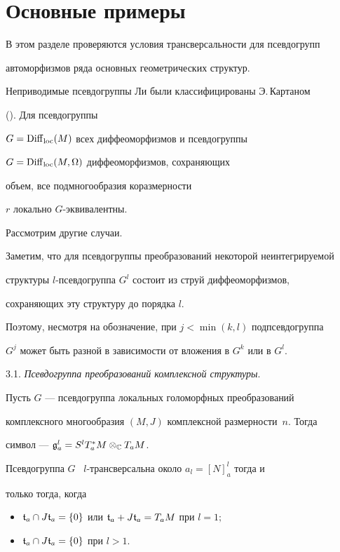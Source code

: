 \section{Основные примеры}





В этом разделе проверяются условия трансверсальности для псевдогрупп


автоморфизмов ряда основных геометрических структур.


Неприводимые псевдогруппы Ли были классифицированы Э.\,Картаном


(\cite{C}). Для псевдогруппы


$G=\operatorname{Diff}_{\operatorname{loc}}(M)$ всех диффеоморфизмов и псевдогруппы


$G=\operatorname{Diff}_{\operatorname{loc}}(M,\Omega)$ диффеоморфизмов, сохраняющих


объем, все подмногообразия коразмерности


$r$ локально $G$-эквивалентны. 





Рассмотрим другие случаи.


Заметим, что для псевдогруппы преобразований некоторой неинтегрируемой


структуры $l$-псевдогруппа $G^l$ состоит из струй диффеоморфизмов,


сохраняющих эту структуру до порядка $l$.


Поэтому, несмотря на обозначение, при $j<\min(k,l)$ подпсевдогруппа


$G^j$ может быть разной в зависимости от вложения в $G^k$ или в $G^l$.


\medskip





3.1. {\it Псевдогруппа преобразований комплексной структуры}.


Пусть $G$ --- псевдогруппа локальных голоморфных преобразований


комплексного многообразия $(M,J)$ комплексной размерности~$n$. Тогда


символ --- ${\frak g}^l_a=S^lT^*_aM\otimes_{\Bbb C} T_aM$.





\begin{prop}\label{CC}


Псевдогруппа $G$ \ $l$-трансверсальна около $a_l=[N]_a^l$ тогда и


только тогда, когда


\begin{itemize}


\item[1.]


${\frak t}_a\cap J{\frak t}_a=\{0\}$ или ${\frak t}_a+J{\frak t}_a=T_aM$ при $l=1;$


\item[2.]


${\frak t}_a\cap J{\frak t}_a=\{0\}$ при $l>1$.


\end{itemize}


\end{prop}






